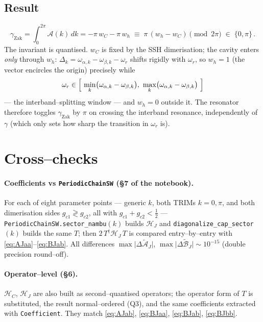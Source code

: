 \documentclass[11pt]{article}
\newcommand{\oa}{\omega_{\alpha,k}}
\newcommand{\ob}{\omega_{\beta,k}}
\newcommand{\AJ}{\tilde{\mathcal{A}}_J}
\newcommand{\BJ}{\tilde{\mathcal{B}}_J}
\newcommand{\wC}{w_C}
\newcommand{\wh}{w_h}
\begin{document}
\subsection{Result}

\begin{equation}\label{eq:zak}
  \boxed{\;
  \gamma_{\mathrm{Zak}}
   =\int_{0}^{2\pi}\!\mathcal A(k)\,dk
   =-\pi\,\wC-\pi\,\wh
   \;\equiv\;\pi\,(\wh-\wC)\pmod{2\pi}
   \;\in\;\{0,\pi\}\,.
  \;}
\end{equation}
The invariant is quantised. $\wC$ is fixed by the SSH dimerisation; the cavity
enters \emph{only} through $\wh$: $\Delta_k=\oa-\ob-\omega_r$ shifts rigidly with
$\omega_r$, so $\wh=1$ (the vector encircles the origin) precisely while
\begin{equation}
  \omega_r\in\Bigl[\ \min_{k}\bigl(\oa-\ob\bigr),\ \max_{k}\bigl(\oa-\ob\bigr)\ \Bigr]
\end{equation}
--- the interband--splitting window --- and $\wh=0$ outside it. The resonator
therefore toggles $\gamma_{\mathrm{Zak}}$ by $\pi$ on crossing the interband
resonance, independently of $\gamma$ (which only sets how sharp the transition in
$\omega_r$ is).

\section{Cross--checks}\label{sec:checks}

\paragraph{Coefficients vs \texttt{PeriodicChainSW} (\S7 of the notebook).}
For each of eight parameter points --- generic $k$, both TRIMs $k=0,\pi$, and both
dimerisation sides $g_{c1}\gtrless g_{c2}$, all with $g_{c1}+g_{c2}<\tfrac12$ ---
\texttt{PeriodicChainSW.sector\_nambu}$(k)$ builds $\mathcal H_J$ and
\texttt{diagonalize\_cap\_sector}$(k)$ builds the same $T$; then
$2\,T^{\dagger}\mathcal H_J\,T$ is compared entry--by--entry with
\eqref{eq:AJaa}--\eqref{eq:BJab}. All differences
$\max\lvert\Delta\AJ\rvert$, $\max\lvert\Delta\BJ\rvert\sim10^{-15}$ (double
precision round--off).

\paragraph{Operator--level (\S6).}
$\mathcal H_C$, $\mathcal H_J$ are also built as second--quantised operators;
the operator form of $T$ is substituted, the result normal--ordered (Q3), and the
same coefficients extracted with \texttt{Coefficient}. They match
\eqref{eq:AJab}, \eqref{eq:BJaa}, \eqref{eq:BJab}, \eqref{eq:BJbb}.
\end{document}
